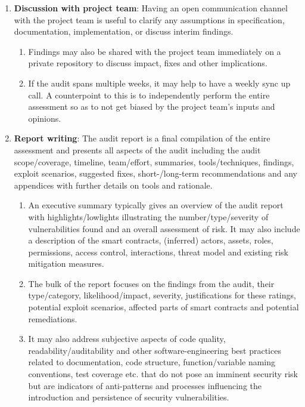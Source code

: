 \begin{enumerate}
\item\textbf{Discussion with project team}: Having an open communication channel with the project team is useful to clarify any assumptions in specification, documentation, implementation, or discuss interim findings.
	\begin{enumerate}
	\item Findings may also be shared with the project team immediately on a private repository to discuss impact, fixes and other implications.
	\item If the audit spans multiple weeks, it may help to have a weekly sync up call. A counterpoint to this is to independently perform the entire assessment so as to not get biased by the project team’s inputs and opinions.
	\end{enumerate}

\item\textbf{Report writing}: The audit report is a final compilation of the entire assessment and presents all aspects of the audit including the audit scope/coverage, timeline, team/effort, summaries, tools/techniques, findings, exploit scenarios, suggested fixes, short-/long-term recommendations and any appendices with further details on tools and rationale.
	\begin{enumerate}
	\item An executive summary typically gives an overview of the audit report with highlights/lowlights illustrating the number/type/severity of vulnerabilities found and an overall assessment of risk. It may also include a description of the smart contracts, (inferred) actors, assets, roles, permissions, access control, interactions, threat model and existing risk mitigation measures.
	\item The bulk of the report focuses on the findings from the audit, their type/category, likelihood/impact, severity, justifications for these ratings, potential exploit scenarios, affected parts of smart contracts and potential remediations.
	\item It may also address subjective aspects of code quality, readability/auditability and other software-engineering best practices related to documentation, code structure, function/variable naming conventions, test coverage etc. that do not pose an imminent security risk but are indicators of anti-patterns and processes influencing the introduction and persistence of security vulnerabilities.
	\end{enumerate}


\end{enumerate}
